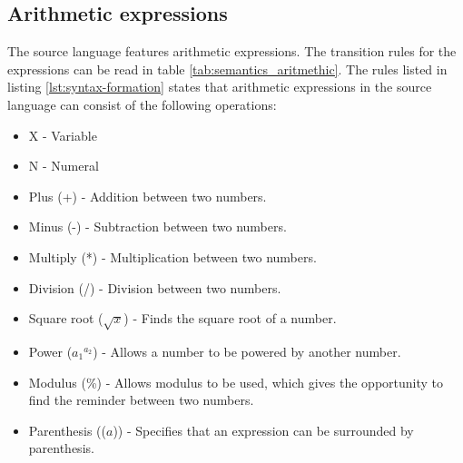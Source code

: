 \subsection{Arithmetic expressions}
The source language features arithmetic expressions. The transition rules for the expressions can be read in table \ref{tab:semantics_aritmethic}.
The rules listed in listing \ref{lst:syntax-formation} states that arithmetic expressions in the source language can consist of the following operations:
\begin{itemize}
	\item X - Variable
	\item N - Numeral
	\item Plus (+) - Addition between two numbers.
	\item Minus (-) - Subtraction between two numbers.
	\item Multiply (*) - Multiplication between two numbers.
	\item Division (/) - Division between two numbers.
	\item Square root ($\sqrt{x}$) - Finds the square root of a number.
	\item Power (${a_1}^{a_2}$) - Allows a number to be powered by another number.
	\item Modulus (\%) - Allows modulus to be used, which gives the opportunity to find the reminder between two numbers.
	\item Parenthesis (($a$)) - Specifies that an expression can be surrounded by parenthesis.
\end{itemize}

